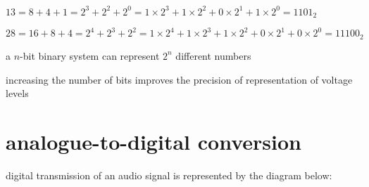 
\sol $13 = 8 + 4 + 1 = 2^3 + 2^2 + 2^0 = 1\times2^3 + 1\times2^2 + 0\times2^1 + 1\times2^0 = 1101_2$

$28 = 16 + 8 + 4 = 2^4 + 2^3 + 2^2 = 1\times 2^4 + 1\times2^3 + 1\times2^2 + 0\times2^1 + 0\times2^0 = 11100_2$ \eoe

\cmt a $n$-bit binary system can represent $2^n$ different numbers

increasing the number of bits improves the precision of representation of voltage levels

\section{analogue-to-digital conversion}

digital transmission of an audio signal is represented by the diagram below:

